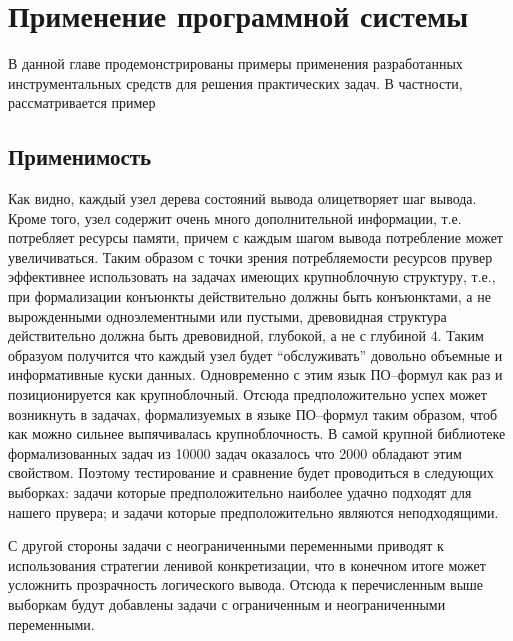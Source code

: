 \chapter{Применение программной системы}
\label{part:examples}

В данной главе продемонстрированы примеры применения разработанных инструментальных средств  для решения практических задач. В частности, рассматривается пример 

\section{Применимость}
Как видно, каждый узел дерева состояний вывода олицетворяет шаг вывода. Кроме того, узел содержит очень много дополнительной информации, т.е. потребляет ресурсы памяти, причем с каждым шагом вывода потребление может увеличиваться. Таким образом с точки зрения потребляемости ресурсов прувер эффективнее использовать на задачах имеющих крупноблочную структуру, т.е., при формализации конъюнкты действительно должны быть конъюнктами, а не вырожденными одноэлементными или пустыми, древовидная структура действительно должна быть древовидной, глубокой, а не с глубиной 4. Таким образуом получится что каждый узел будет “обслуживать” довольно объемные и информативные куски данных. Одновременно с этим язык ПО--формул как раз и позиционируется как крупноблочный. Отсюда предположительно успех может возникнуть в задачах, формализуемых в языке ПО--формул таким образом, чтоб как можно сильнее выпячивалась крупноблочность. В самой крупной библиотеке формализованных задач из 10000 задач оказалось что 2000 обладают этим свойством. Поэтому тестирование и сравнение будет проводиться в следующих выборках: задачи которые предположительно наиболее удачно подходят для нашего прувера; и задачи которые предположительно являются неподходящими. 

С другой стороны задачи с неограниченными переменными приводят к использования стратегии ленивой конкретизации, что в конечном итоге может усложнить прозрачность логического вывода. Отсюда к перечисленным выше выборкам будут добавлены задачи с ограниченным и неограниченными переменными.

